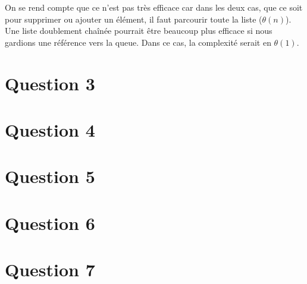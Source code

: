 \documentclass[10pt,a4paper]{article}
\begin{document}
On se rend compte que ce n'est pas très efficace car dans les deux cas, que ce soit pour supprimer ou ajouter un élément, il faut parcourir toute la liste ($\theta (n)$). 
Une liste doublement chaînée pourrait être beaucoup plus efficace si nous gardions une référence vers la queue. Dans ce cas, la complexité serait en $\theta (1)$.

\section*{Question 3}
\section*{Question 4}
\section*{Question 5}
\section*{Question 6}
\section*{Question 7}
\end{document}
